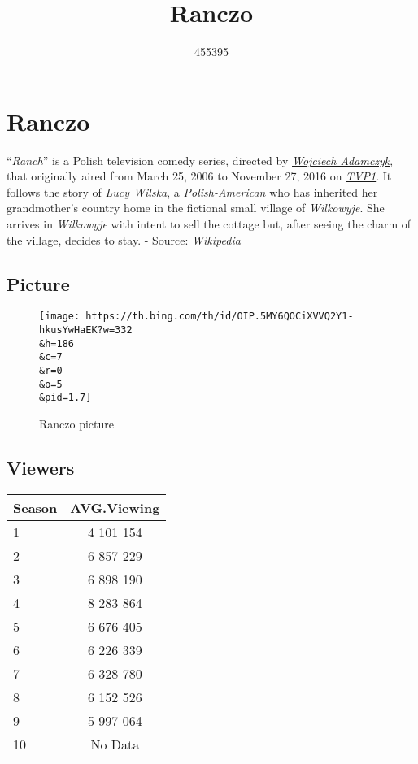 \documentclass[
  letterpaper,
  DIV=11,
  numbers=noendperiod]{scrartcl}
\title{Ranczo}
\author{455395}
\date{}
\begin{document}
\maketitle
\ifdefined\Shaded\renewenvironment{Shaded}{\begin{tcolorbox}[boxrule=0pt, enhanced, frame hidden, borderline west={3pt}{0pt}{shadecolor}, sharp corners, interior hidden, breakable]}{\end{tcolorbox}}\fi

\hypertarget{ranczo}{%
\section{Ranczo}\label{ranczo}}

``\emph{Ranch}'' is a Polish television comedy series, directed by
\href{https://en.wikipedia.org/w/index.php?title=Wojciech_Adamczyk\&action=edit\&redlink=1}{\emph{Wojciech
Adamczyk}}, that originally aired from March 25, 2006 to November 27,
2016 on \href{https://en.wikipedia.org/wiki/TVP1}{\emph{TVP1}}. It
follows the story of \emph{Lucy Wilska}, a
\href{https://en.wikipedia.org/wiki/Polish-American}{\emph{Polish-American}}
who has inherited her grandmother's country home in the fictional small
village of \emph{Wilkowyje}. She arrives in \emph{Wilkowyje} with intent
to sell the cottage but, after seeing the charm of the village, decides
to stay. - Source: \emph{Wikipedia}

\hypertarget{picture}{%
\subsection{Picture}\label{picture}}

\begin{figure}

{\centering \texttt{[image: https://th.bing.com/th/id/OIP.5MY6QOCiXVVQ2Y1-hkusYwHaEK?w=332\\\&h=186\\\&c=7\\\&r=0\\\&o=5\\\&pid=1.7]}

}

\caption{Ranczo picture}

\end{figure}

\hypertarget{viewers}{%
\subsection{Viewers}\label{viewers}}

\begin{longtable}[]{@{}lc@{}}
\toprule()
Season & AVG.Viewing \\
\midrule()
\endhead
1 & 4 101 154 \\
2 & 6 857 229 \\
3 & 6 898 190 \\
4 & 8 283 864 \\
5 & 6 676 405 \\
6 & 6 226 339 \\
7 & 6 328 780 \\
8 & 6 152 526 \\
9 & 5 997 064 \\
10 & No Data \\
\bottomrule()
\end{longtable}
\end{document}
